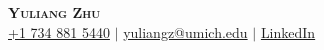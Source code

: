 \documentclass[letterpaper,11pt]{article}
\newcommand{\resumeSubHeadingListStart}{\begin{itemize}[leftmargin=0.15in, label={}]}
\begin{document}

\begin{center}
    \textbf{\Huge \scshape Yuliang Zhu} \\ \vspace{1pt}
    \small
    \faMobile \hspace{.5pt} \href{tel:1734885440}{+1 734 881 5440}
    $|$
    \faAt \hspace{.5pt} \href{mailto:yuliangz@umich.edu}{yuliangz@umich.edu}
    $|$
    \faLinkedinSquare \hspace{.5pt} \href{https://www.linkedin.com/in/yuliang-zhu-34005315b}{LinkedIn}
\end{center}



        
        
\end{document}
